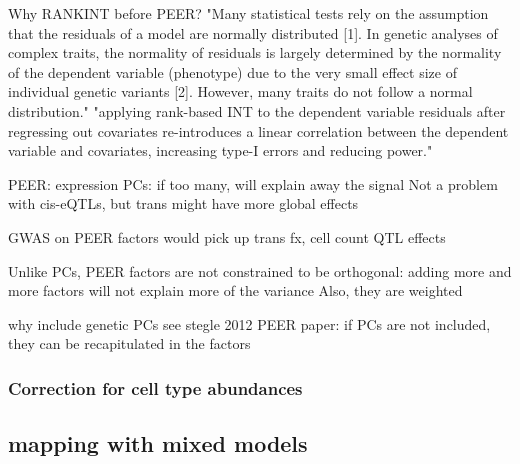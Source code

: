 Why RANKINT before PEER?
"Many statistical tests rely on the assumption that the residuals of a model are normally distributed [1]. In genetic analyses of complex traits, the normality of residuals is largely determined by the normality of the dependent variable (phenotype) due to the very small effect size of individual genetic variants [2]. However, many traits do not follow a normal distribution."
"applying rank-based INT to the dependent variable residuals after regressing out covariates re-introduces a linear correlation between the dependent variable and covariates, increasing type-I errors and reducing power."

PEER:
expression PCs: if too many, will explain away the signal
Not a problem with cis-eQTLs, but trans might have more global effects

    GWAS on PEER factors would pick up trans fx, cell count QTL effects

Unlike PCs, PEER factors are not constrained to be orthogonal: adding more and more factors will not explain more of the variance
    Also, they are weighted

why include genetic PCs
see stegle 2012 PEER paper: if PCs are not included, they can be recapitulated in the factors

\subsubsection{Correction for cell type abundances}

\subsection{ mapping with mixed models}



